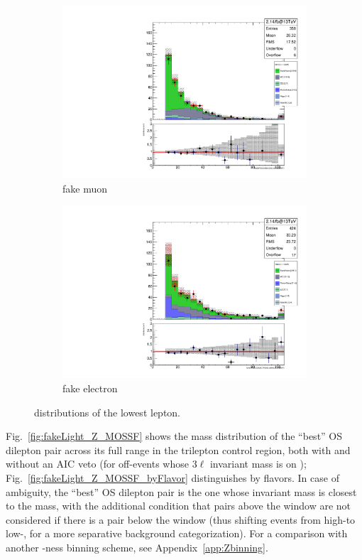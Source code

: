 \begin{figure}
\begin{center}
	\begin{subfigure}[b]{.7\textwidth}
		\includegraphics[width=\textwidth]{Background/bkg_fakeLight/Z_muFake_MINMUONPT}
		\caption{fake muon}
	\end{subfigure}
	\begin{subfigure}[b]{.7\textwidth}
		\includegraphics[width=\textwidth]{Background/bkg_fakeLight/Z_elFake_MINELECTRONPT}
		\caption{fake electron}
	\end{subfigure}
	\caption{\pt distributions of the lowest \pt lepton.
	\label{fig:fakeLight_Z_MINleptonPT}}
\end{center}
\end{figure}

Fig.~\ref{fig:fakeLight_Z_MOSSF} shows the mass distribution of the ``best'' OS dilepton pair across its full range in the trilepton control region, both with and without an AIC veto (for off-\Z events whose 3$\ell$ invariant mass is on \Z); Fig.~\ref{fig:fakeLight_Z_MOSSF_byFlavor} distinguishes by flavors. In case of ambiguity, the ``best'' OS dilepton pair is the one whose invariant mass is closest to the \Z mass, with the additional condition that pairs above the \Z window are not considered if there is a pair below the \Z window (thus shifting events from high-\Z to low-\Z, for a more separative background categorization). For a comparison with another \Z-ness binning scheme, see Appendix~\ref{app:Zbinning}.

